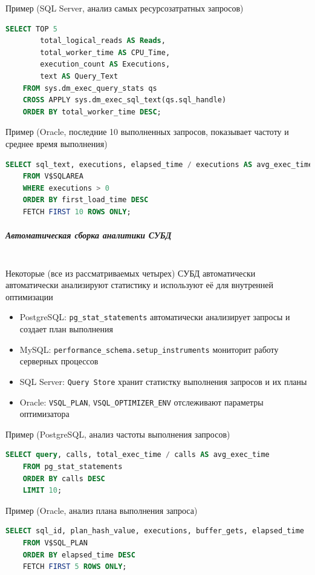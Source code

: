Пример (SQL Server, анализ самых ресурсозатратных запросов)
\begin{lstlisting}[language=SQL]
    SELECT TOP 5 
        total_logical_reads AS Reads, 
        total_worker_time AS CPU_Time, 
        execution_count AS Executions, 
        text AS Query_Text 
    FROM sys.dm_exec_query_stats qs
    CROSS APPLY sys.dm_exec_sql_text(qs.sql_handle)
    ORDER BY total_worker_time DESC;
\end{lstlisting}

Пример (Oracle, последние 10 выполненных запросов, показывает частоту и среднее время выполнения)
\begin{lstlisting}[language=SQL]
    SELECT sql_text, executions, elapsed_time / executions AS avg_exec_time
    FROM V$SQLAREA
    WHERE executions > 0
    ORDER BY first_load_time DESC
    FETCH FIRST 10 ROWS ONLY;
\end{lstlisting}

\subparagraph{Автоматическая сборка аналитики СУБД} ~\\

Некоторые (все из рассматриваемых четырех) СУБД автоматически автоматически анализируют статистику и используют её для внутренней оптимизации
\begin{itemize}
    \item PostgreSQL: \texttt{pg\_stat\_statements} автоматически анализирует запросы и создает план выполнения
    \item MySQL: \texttt{performance\_schema.setup\_instruments} мониторит работу серверных процессов
    \item SQL Server: \texttt{Query Store} хранит статистку выполнения запросов и их планы
    \item Oracle: \texttt{V\textdollar SQL\_PLAN}, \texttt{V\textdollar SQL\_OPTIMIZER\_ENV} отслеживают параметры оптимизатора
\end{itemize}

Пример (PostgreSQL, анализ частоты выполнения запросов)
\begin{lstlisting}[language=SQL]
    SELECT query, calls, total_exec_time / calls AS avg_exec_time
    FROM pg_stat_statements
    ORDER BY calls DESC
    LIMIT 10;
\end{lstlisting}

Пример (Oracle, анализ плана выполнения запроса)
\begin{lstlisting}[language=SQL]
    SELECT sql_id, plan_hash_value, executions, buffer_gets, elapsed_time
    FROM V$SQL_PLAN
    ORDER BY elapsed_time DESC
    FETCH FIRST 5 ROWS ONLY;
\end{lstlisting}

